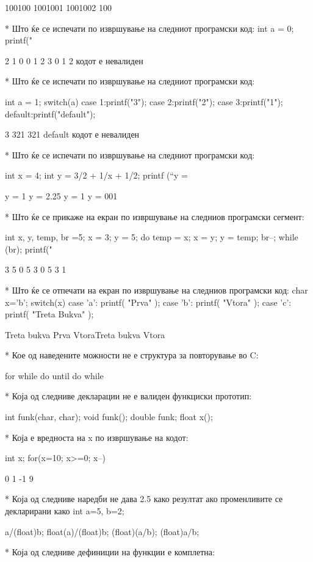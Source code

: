 {100100
1001001
1001002
100

* Што ќе се испечати по извршување на следниот програмски код:
int a = 0; 
printf(" %

2 1 0
0 1 2 3
0 1 2
кодот е невалиден


* Што ќе се испечати по извршување на следниот програмски код:

int a = 1; 
switch(a)
{
             case 1:printf("3");
             case 2:printf("2");
             case 3:printf("1");
             default:printf("default");
}

3
321
321 default      
кодот е невалиден

* Што ќе се испечати по извршување на следниот програмски код:

int x = 4;
int y = 3/2 + 1/x + 1/2;
printf (“y = %

y = 1
y = 2.25
y = 1
y = 001

* Што ќе се прикаже на екран по извршување на следниов програмски сегмент: 

int x, y, temp, br =5;
x = 3; y = 5;
    do {
            temp = x; x = y; y = temp;
        br--;       
        }
    while (br);
    printf("%

3 5 0
5 3 0
5 3 1    
                             
* Што ќе се отпечати на екран по извршување на следниов програмски код:
char x='b';
switch(x)
{
  case 'a': printf( "Prva" );
  case 'b': printf( "Vtora" );
  case 'c': printf( "Treta Bukva" );
}

Treta bukva
Prva
VtoraTreta bukva
Vtora   

* Кое од наведените можности не е структура за повторување во C:

for
while
do until
do while

* Која од следниве декларации не е валиден функциски прототип:

int funk(char, char);
void funk();
double funk;
float x();

* Која е вредноста на x по извршување на кодот: 

int x; for(x=10; x>=0; x--) {} 

0
1
-1
9

* Која од следниве наредби не дава 2.5 како резултат ако променливите се
декларирани како int a=5, b=2;

a/(float)b;
float(a)/(float)b;
(float)(a/b);
(float)a/b;

* Која од следниве дефиниции на функции е комплетна:

}
